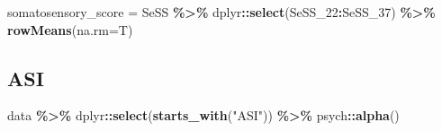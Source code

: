 \documentclass[
]{article}
\newenvironment{Shaded}{\begin{snugshade}}{\end{snugshade}}
\newcommand{\AttributeTok}[1]{\textcolor[rgb]{0.13,0.29,0.53}{#1}}
\newcommand{\FunctionTok}[1]{\textcolor[rgb]{0.13,0.29,0.53}{\textbf{#1}}}
\newcommand{\NormalTok}[1]{#1}
\newcommand{\OtherTok}[1]{\textcolor[rgb]{0.56,0.35,0.01}{#1}}
\newcommand{\SpecialCharTok}[1]{\textcolor[rgb]{0.81,0.36,0.00}{\textbf{#1}}}
\newcommand{\StringTok}[1]{\textcolor[rgb]{0.31,0.60,0.02}{#1}}
\begin{document}
\begin{Shaded}
\begin{Highlighting}[]
\NormalTok{somatosensory\_score }\OtherTok{=}\NormalTok{ SeSS }\SpecialCharTok{\%\textgreater{}\%}\NormalTok{ dplyr}\SpecialCharTok{::}\FunctionTok{select}\NormalTok{(SeSS\_22}\SpecialCharTok{:}\NormalTok{SeSS\_37) }\SpecialCharTok{\%\textgreater{}\%} \FunctionTok{rowMeans}\NormalTok{(}\AttributeTok{na.rm=}\NormalTok{T)}
\end{Highlighting}
\end{Shaded}

\begin{Shaded}
\end{Shaded}

\subsection{ASI}\label{asi}

\begin{Shaded}
\begin{Highlighting}[]
\NormalTok{data }\SpecialCharTok{\%\textgreater{}\%}\NormalTok{ dplyr}\SpecialCharTok{::}\FunctionTok{select}\NormalTok{(}\FunctionTok{starts\_with}\NormalTok{(}\StringTok{"ASI"}\NormalTok{)) }\SpecialCharTok{\%\textgreater{}\%}\NormalTok{ psych}\SpecialCharTok{::}\FunctionTok{alpha}\NormalTok{()}
\end{Highlighting}
\end{Shaded}
\end{document}
